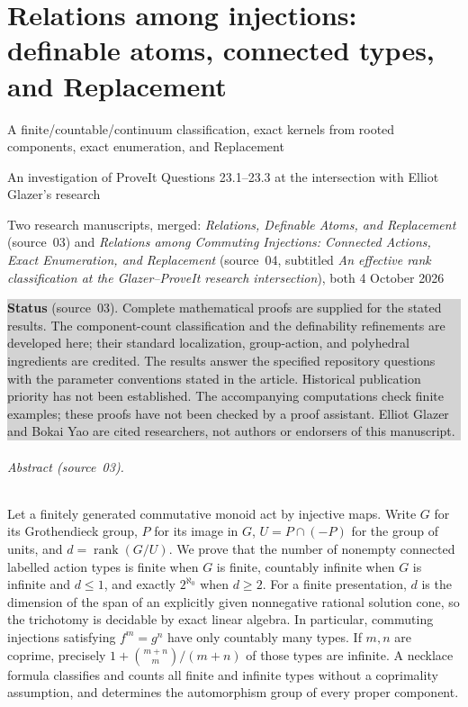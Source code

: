 \documentclass[11pt,letterpaper]{article}
\numberwithin{equation}{section}
\theoremstyle{plain}
\theoremstyle{definition}
\theoremstyle{remark}
\newcommand{\rank}{\operatorname{rank}}
\newcommand{\status}[1]{\par\noindent\colorbox{lightgray}{\parbox{\dimexpr\linewidth-2\fboxsep\relax}{#1}}\par}
\begin{document}
\part{Relations among injections: definable atoms, connected types, and Replacement}
\label{nee:aa:part}

\setcounter{section}{23}
\renewcommand{\thesection}{\arabic{section}}
\renewcommand{\theHsection}{aa.\arabic{section}}
\makeatletter\gdef\Hy@chapapp{\Hy@chapterstring}\makeatother

{\Large A finite/countable/continuum classification, exact kernels from rooted components, exact enumeration, and Replacement\par}
\smallskip
{\large An investigation of ProveIt Questions 23.1--23.3 at the intersection with Elliot Glazer's research\par}
\smallskip
{Two research manuscripts, merged: \emph{Relations, Definable Atoms, and Replacement} (source~03) and \emph{Relations among Commuting Injections: Connected Actions, Exact Enumeration, and Replacement} (source~04, subtitled \emph{An effective rank classification at the Glazer--ProveIt research intersection}), both 4 October 2026\par}

\status{\textbf{Status} (source~03). Complete mathematical proofs are supplied for the stated results. The component-count classification and the definability refinements are developed here; their standard localization, group-action, and polyhedral ingredients are credited. The results answer the specified repository questions with the parameter conventions stated in the article. Historical publication priority has not been established. The accompanying computations check finite examples; these proofs have not been checked by a proof assistant. Elliot Glazer and Bokai Yao are cited researchers, not authors or endorsers of this manuscript.}

\paragraph{Abstract (source~03).}
Let a finitely generated commutative monoid act by injective maps. Write $G$ for
its Grothendieck group, $P$ for its image in $G$, $U=P\cap(-P)$ for the group of
units, and $d=\rank(G/U)$. We prove that the number of nonempty connected labelled
action types is finite when $G$ is finite, countably infinite when $G$ is infinite
and $d\leq1$, and exactly $2^{\aleph_0}$ when $d\geq2$. For a finite presentation,
$d$ is the dimension of the span of an explicitly given nonnegative rational
solution cone, so the trichotomy is decidable by exact linear algebra. In
particular, commuting injections satisfying $f^m=g^n$ have only countably many
types. If $m,n$ are coprime, precisely
$1+\binom{m+n}{m}/(m+n)$ of those types are infinite. A necklace formula
classifies and counts all finite and infinite types without a coprimality
assumption, and determines the automorphism group of every proper component.
\end{document}
